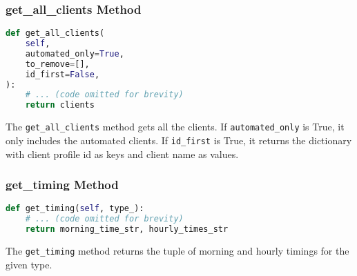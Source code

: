 \subsubsection{get\_all\_clients Method}

\begin{lstlisting}[language=Python]
def get_all_clients(
    self,
    automated_only=True,
    to_remove=[],
    id_first=False,
):
    # ... (code omitted for brevity)
    return clients
\end{lstlisting}

The \verb|get_all_clients| method gets all the clients. If \verb|automated_only| is True, it only includes the automated clients. If \verb|id_first| is True, it returns the dictionary with client profile id as keys and client name as values.

\subsubsection{get\_timing Method}

\begin{lstlisting}[language=Python]
def get_timing(self, type_):
    # ... (code omitted for brevity)
    return morning_time_str, hourly_times_str
\end{lstlisting}

The \verb|get_timing| method returns the tuple of morning and hourly timings for the given type.